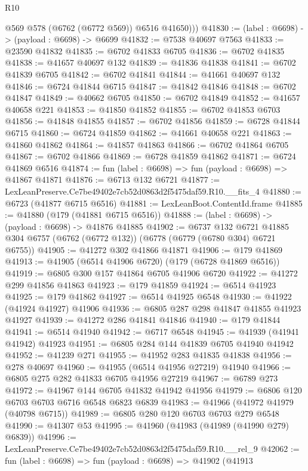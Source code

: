\begin{lexlean}{R10}
\begin{coremodule}
          @569
          @578
          (@6762 (@6772 @569))
          @6516
          @41650)))
@41830 := (label : @6698) -> (payload : @6698) -> @6699
@41832 := @7538 @40697 @7563
@41833 := @23590 @41832
@41835 := @6702 @41833 @6705
@41836 := @6702 @41835
@41838 := @41657 @40697 @132
@41839 := @41836 @41838
@41841 := @6702 @41839 @6705
@41842 := @6702 @41841
@41844 := @41661 @40697 @132
@41846 := @6724 @41844 @6715
@41847 := @41842 @41846
@41848 := @6702 @41847
@41849 := @40662 @6705
@41850 := @6702 @41849
@41852 := @41657 @40658 @221
@41853 := @41850 @41852
@41855 := @6702 @41853 @6703
@41856 := @41848 @41855
@41857 := @6702 @41856
@41859 := @6728 @41844 @6715
@41860 := @6724 @41859
@41862 := @41661 @40658 @221
@41863 := @41860 @41862
@41864 := @41857 @41863
@41866 := @6702 @41864 @6705
@41867 := @6702 @41866
@41869 := @6728 @41859 @41862
@41871 := @6724 @41869 @6516
@41874 := fun (label : @6698) => fun (payload : @6698) => @41867 @41871
@41876 := @6713 @132 @6721
@41877 := LexLeanPreserve.Ce7be49402e7cb52d0863d2f5475daf59.R10.__fits_4
@41880 := @6723 (@41877 @6715 @6516)
@41881 := LexLeanBoot.ContentId.frame
@41885 := @41880 (@179 (@41881 @6715 @6516))
@41888 := (label : @6698) -> (payload : @6698) -> @41876 @41885
@41902 := @6737
    @132
    @6721
    @41885
    @304
    @6757
    (@6762 (@6772 @132))
    (@6778 (@6779 (@6780 @304) @6721 @6755))
@41905 := @41272 @302 @41866 @41871
@41906 := @179 @41869
@41913 := @41905 (@6514 @41906 @6720) (@179 (@6728 @41869 @6516))
@41919 := @6805 @300 @157 @41864 @6705 @41906 @6720
@41922 := @41272 @299 @41856 @41863
@41923 := @179 @41859
@41924 := @6514 @41923
@41925 := @179 @41862
@41927 := @6514 @41925 @6548
@41930 := @41922 (@41924 @41927) @41906
@41936 := @6805 @287 @298 @41847 @41855 @41923 @41927
@41939 := @41272 @286 @41841 @41846
@41940 := @179 @41844
@41941 := @6514 @41940
@41942 := @6717 @6548
@41945 := @41939 (@41941 @41942) @41923
@41951 := @6805 @284 @144 @41839 @6705 @41940 @41942
@41952 := @41239 @271
@41955 := @41952 @283 @41835 @41838
@41956 := @278 @40697
@41960 := @41955 (@6514 @41956 @27219) @41940
@41966 := @6805 @275 @282 @41833 @6705 @41956 @27219
@41967 := @6789 @273
@41972 := @41967 @144 @6705 @41832 @41942 @41956
@41979 := @6806 @120 @6703 @6703 @6716 @6548 @6823 @6839
@41983 := @41966 (@41972 @41979 (@40798 @6715))
@41989 := @6805 @280 @120 @6703 @6703 @279 @6548
@41990 := @41307 @53
@41995 := @41960 (@41983 (@41989 (@41990 @279) @6839))
@41996 := LexLeanPreserve.Ce7be49402e7cb52d0863d2f5475daf59.R10.__rel_9
@42062 := fun (label : @6698) =>
  fun (payload : @6698) =>
  @41902
    (@41913

\end{coremodule}
\end{lexlean}
